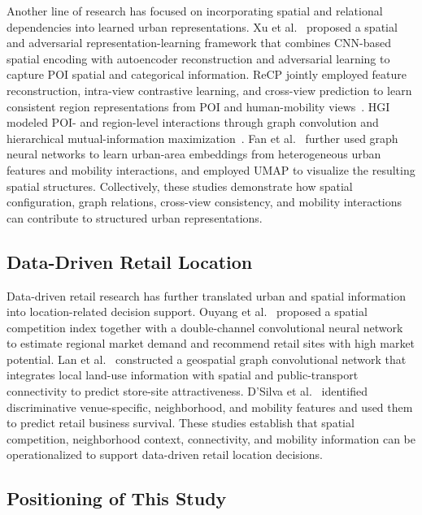 \documentclass[sigconf]{acmart}
\begin{document}
Another line of research has focused on incorporating spatial and relational dependencies into learned urban representations. Xu et al.~\cite{xu2023spatial} proposed a spatial and adversarial representation-learning framework that combines CNN-based spatial encoding with autoencoder reconstruction and adversarial learning to capture POI spatial and categorical information. ReCP jointly employed feature reconstruction, intra-view contrastive learning, and cross-view prediction to learn consistent region representations from POI and human-mobility views~\cite{li2024urban}. HGI modeled POI- and region-level interactions through graph convolution and hierarchical mutual-information maximization~\cite{huang2023learning}. Fan et al.~\cite{fan2024neural} further used graph neural networks to learn urban-area embeddings from heterogeneous urban features and mobility interactions, and employed UMAP to visualize the resulting spatial structures. Collectively, these studies demonstrate how spatial configuration, graph relations, cross-view consistency, and mobility interactions can contribute to structured urban representations.

\subsection{Data-Driven Retail Location}

Data-driven retail research has further translated urban and spatial information into location-related decision support. Ouyang et al.~\cite{ouyang2020site} proposed a spatial competition index together with a double-channel convolutional neural network to estimate regional market demand and recommend retail sites with high market potential. Lan et al.~\cite{lan2022site} constructed a geospatial graph convolutional network that integrates local land-use information with spatial and public-transport connectivity to predict store-site attractiveness. D'Silva et al.~\cite{dsilva2018role} identified discriminative venue-specific, neighborhood, and mobility features and used them to predict retail business survival. These studies establish that spatial competition, neighborhood context, connectivity, and mobility information can be operationalized to support data-driven retail location decisions.

\subsection{Positioning of This Study}
\end{document}
